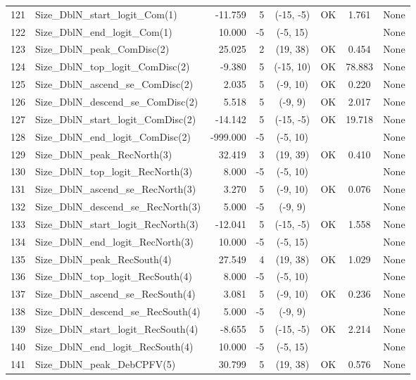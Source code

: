 \documentclass[12pt,]{article}
\begin{document}
\begin{landscape}
\begin{longtable}{rlrrcccp{1.5in}}
  121 & Size\_DblN\_start\_logit\_Com(1) & -11.759 & 5 & (-15, -5) & OK & 1.761 & None \\ 
  122 & Size\_DblN\_end\_logit\_Com(1) & 10.000 & -5 & (-5, 15) &  &  & None \\ 
  123 & Size\_DblN\_peak\_ComDisc(2) & 25.025 & 2 & (19, 38) & OK & 0.454 & None \\ 
  124 & Size\_DblN\_top\_logit\_ComDisc(2) & -9.380 & 5 & (-15, 10) & OK & 78.883 & None \\ 
  125 & Size\_DblN\_ascend\_se\_ComDisc(2) & 2.035 & 5 & (-9, 10) & OK & 0.220 & None \\ 
  126 & Size\_DblN\_descend\_se\_ComDisc(2) & 5.518 & 5 & (-9, 9) & OK & 2.017 & None \\ 
  127 & Size\_DblN\_start\_logit\_ComDisc(2) & -14.142 & 5 & (-15, -5) & OK & 19.718 & None \\ 
  128 & Size\_DblN\_end\_logit\_ComDisc(2) & -999.000 & -5 & (-5, 10) &  &  & None \\ 
  129 & Size\_DblN\_peak\_RecNorth(3) & 32.419 & 3 & (19, 39) & OK & 0.410 & None \\ 
  130 & Size\_DblN\_top\_logit\_RecNorth(3) & 8.000 & -5 & (-5, 10) &  &  & None \\ 
  131 & Size\_DblN\_ascend\_se\_RecNorth(3) & 3.270 & 5 & (-9, 10) & OK & 0.076 & None \\ 
  132 & Size\_DblN\_descend\_se\_RecNorth(3) & 5.000 & -5 & (-9, 9) &  &  & None \\ 
  133 & Size\_DblN\_start\_logit\_RecNorth(3) & -12.041 & 5 & (-15, -5) & OK & 1.558 & None \\ 
  134 & Size\_DblN\_end\_logit\_RecNorth(3) & 10.000 & -5 & (-5, 15) &  &  & None \\ 
  135 & Size\_DblN\_peak\_RecSouth(4) & 27.549 & 4 & (19, 38) & OK & 1.029 & None \\ 
  136 & Size\_DblN\_top\_logit\_RecSouth(4) & 8.000 & -5 & (-5, 10) &  &  & None \\ 
  137 & Size\_DblN\_ascend\_se\_RecSouth(4) & 3.081 & 5 & (-9, 10) & OK & 0.236 & None \\ 
  138 & Size\_DblN\_descend\_se\_RecSouth(4) & 5.000 & -5 & (-9, 9) &  &  & None \\ 
  139 & Size\_DblN\_start\_logit\_RecSouth(4) & -8.655 & 5 & (-15, -5) & OK & 2.214 & None \\ 
  140 & Size\_DblN\_end\_logit\_RecSouth(4) & 10.000 & -5 & (-5, 15) &  &  & None \\ 
  141 & Size\_DblN\_peak\_DebCPFV(5) & 30.799 & 5 & (19, 38) & OK & 0.576 & None \\ 

\end{longtable}
\end{landscape}
\end{document}
